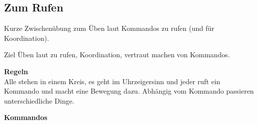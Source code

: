 \newpage


\subsection*{\centering \LARGE Zum Rufen}

Kurze Zwischenübung zum Üben laut Kommandos zu rufen (und für Koordination). 

\begin{bclogo}[logo=\bcoutil]{Ziel}
Üben laut zu rufen, Koordination, vertraut machen von Kommandos.
\end{bclogo}

\textbf{\large Regeln}\\

Alle stehen in einem Kreis, es geht im Uhrzeigersinn und jeder ruft ein Kommando und macht eine Bewegung dazu. Abhängig vom Kommando passieren unterschiedliche Dinge.

\textbf{\large Kommandos}

